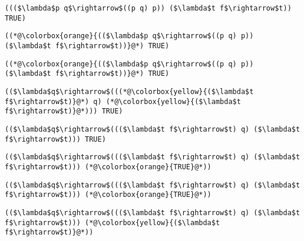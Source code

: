 \documentclass{beamer}
\begin{document}
\begin{frame}[fragile]{\CurrentSection}
\lstset{basicstyle=\ttfamily\small}\lstset{numbers=none}\lstset{language=ML}\begin{lstlisting}
((($\lambda$p q$\rightarrow$((p q) p)) ($\lambda$t f$\rightarrow$t)) TRUE)
\end{lstlisting}
\pause\lstset{language=ML}\begin{lstlisting}
((*@\colorbox{orange}{(($\lambda$p q$\rightarrow$((p q) p)) ($\lambda$t f$\rightarrow$t))}@*) TRUE)
\end{lstlisting}

\end{frame}

\begin{frame}[fragile]{\CurrentSection}
\lstset{basicstyle=\ttfamily\small}\lstset{numbers=none}\lstset{language=ML}\begin{lstlisting}
((*@\colorbox{orange}{(($\lambda$p q$\rightarrow$((p q) p)) ($\lambda$t f$\rightarrow$t))}@*) TRUE)
\end{lstlisting}
\pause\lstset{language=ML}\begin{lstlisting}
(($\lambda$q$\rightarrow$(((*@\colorbox{yellow}{($\lambda$t f$\rightarrow$t)}@*) q) (*@\colorbox{yellow}{($\lambda$t f$\rightarrow$t)}@*))) TRUE)
\end{lstlisting}

\end{frame}

\begin{frame}[fragile]{\CurrentSection}
\lstset{basicstyle=\ttfamily\small}\lstset{numbers=none}\lstset{language=ML}\begin{lstlisting}
(($\lambda$q$\rightarrow$((($\lambda$t f$\rightarrow$t) q) ($\lambda$t f$\rightarrow$t))) TRUE)
\end{lstlisting}
\pause\lstset{language=ML}\begin{lstlisting}
(($\lambda$q$\rightarrow$((($\lambda$t f$\rightarrow$t) q) ($\lambda$t f$\rightarrow$t))) (*@\colorbox{orange}{TRUE}@*))
\end{lstlisting}

\end{frame}

\begin{frame}[fragile]{\CurrentSection}
\lstset{basicstyle=\ttfamily\small}\lstset{numbers=none}\lstset{language=ML}\begin{lstlisting}
(($\lambda$q$\rightarrow$((($\lambda$t f$\rightarrow$t) q) ($\lambda$t f$\rightarrow$t))) (*@\colorbox{orange}{TRUE}@*))
\end{lstlisting}
\pause\lstset{language=ML}\begin{lstlisting}
(($\lambda$q$\rightarrow$((($\lambda$t f$\rightarrow$t) q) ($\lambda$t f$\rightarrow$t))) (*@\colorbox{yellow}{($\lambda$t f$\rightarrow$t)}@*))
\end{lstlisting}

\end{frame}
\end{document}
